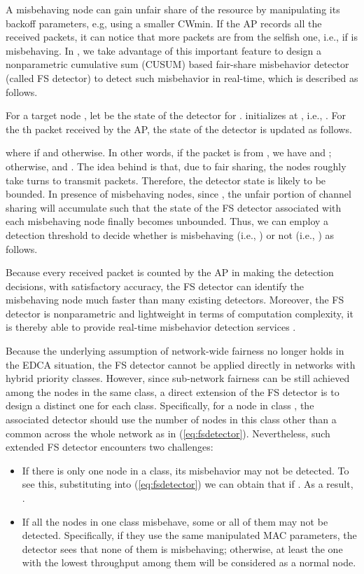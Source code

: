 \documentclass[conference]{IEEEtran}
\begin{document}
A misbehaving node can gain unfair share of the resource by manipulating its backoff parameters, e.g, using a smaller CWmin. If the AP records all the received packets, it can notice that more packets are from the selfish one, i.e.,  if  is misbehaving. In \cite{tang2014real}, we take advantage of this important feature to design a nonparametric cumulative sum (CUSUM) based fair-share misbehavior detector (called FS detector) to detect such misbehavior in real-time, which is described as follows.

For a target node , let  be the state of the detector for .  initializes at , i.e., . For the th packet received by the AP, the state of the detector is updated as follows.

where  if  and  otherwise. In other words, if the packet is from , we have  and ; otherwise,  and . The idea behind is that, due to fair sharing, the nodes roughly take turns to transmit packets. Therefore, the detector state  is likely to be bounded. In presence of misbehaving nodes, since , the unfair portion of channel sharing will accumulate such that the state of the FS detector associated with each misbehaving node finally becomes unbounded. Thus, we can employ a detection threshold  to decide whether  is misbehaving (i.e., ) or not (i.e., ) as follows.


Because every received packet is counted by the AP in making the detection decisions, with satisfactory accuracy, the FS detector can identify the misbehaving node much faster than many existing detectors. Moreover, the FS detector is nonparametric and lightweight in terms of computation complexity, it is thereby able to provide real-time misbehavior detection services \cite{tang2014real}.

Because the underlying assumption of network-wide fairness no longer holds in the EDCA situation, the FS detector cannot be applied directly in networks with hybrid priority classes. However, since sub-network fairness can be still achieved among the nodes in the same class, a direct extension of the FS detector is to design a distinct one for each class. Specifically, for a node in class , the associated detector should use the number of nodes in this class other than a common  across the whole network as in (\ref{eq:fsdetector}). Nevertheless, such extended FS detector encounters two challenges:
\begin{itemize}
\item If there is only one node in a class, its misbehavior may not be detected. To see this, substituting  into (\ref{eq:fsdetector}) we can obtain that  if . As a result, .
\item If all the nodes in one class misbehave, some or all of them may not be detected. Specifically, if they use the same manipulated MAC parameters, the detector sees that none of them is misbehaving; otherwise, at least the one with the lowest throughput among them will be considered as a normal node.
\end{itemize}
\end{document}
